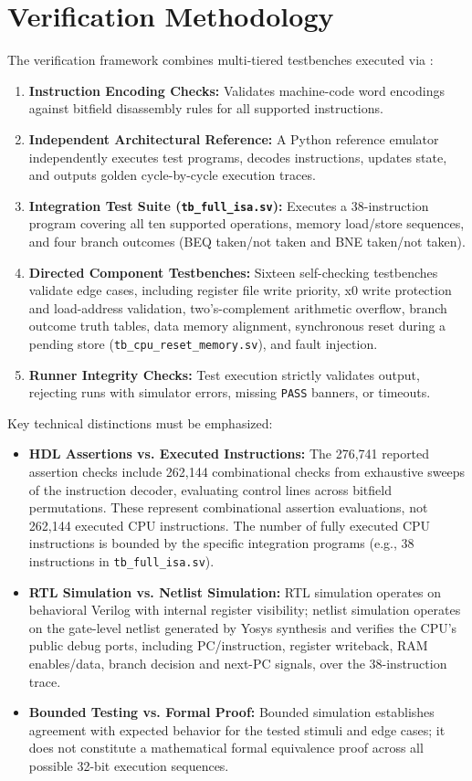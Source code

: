 \documentclass[conference,a4paper]{IEEEtran}
\begin{document}
\section{Verification Methodology}
The verification framework combines multi-tiered testbenches executed via :
\begin{enumerate}
\item \textbf{Instruction Encoding Checks:} Validates machine-code word encodings against bitfield disassembly rules for all supported instructions.
\item \textbf{Independent Architectural Reference:} A Python reference emulator independently executes test programs, decodes instructions, updates state, and outputs golden cycle-by-cycle execution traces.
\item \textbf{Integration Test Suite (\texttt{tb\_full\_isa.sv}):} Executes a 38-instruction program covering all ten supported operations, memory load/store sequences, and four branch outcomes (BEQ taken/not taken and BNE taken/not taken).
\item \textbf{Directed Component Testbenches:} Sixteen self-checking testbenches validate edge cases, including register file write priority, x0 write protection and load-address validation, two's-complement arithmetic overflow, branch outcome truth tables, data memory alignment, synchronous reset during a pending store (\texttt{tb\_cpu\_reset\_memory.sv}), and fault injection.
\item \textbf{Runner Integrity Checks:} Test execution strictly validates output, rejecting runs with simulator errors, missing \texttt{PASS} banners, or timeouts.
\end{enumerate}

Key technical distinctions must be emphasized:
\begin{itemize}
\item \textbf{HDL Assertions vs. Executed Instructions:} The 276,741 reported assertion checks include 262,144 combinational checks from exhaustive sweeps of the instruction decoder, evaluating control lines across bitfield permutations. These represent combinational assertion evaluations, not 262,144 executed CPU instructions. The number of fully executed CPU instructions is bounded by the specific integration programs (e.g., 38 instructions in \texttt{tb\_full\_isa.sv}).
\item \textbf{RTL Simulation vs. Netlist Simulation:} RTL simulation operates on behavioral Verilog with internal register visibility; netlist simulation operates on the gate-level netlist generated by Yosys synthesis and verifies the CPU's public debug ports, including PC/instruction, register writeback, RAM enables/data, branch decision and next-PC signals, over the 38-instruction trace.
\item \textbf{Bounded Testing vs. Formal Proof:} Bounded simulation establishes agreement with expected behavior for the tested stimuli and edge cases; it does not constitute a mathematical formal equivalence proof across all possible 32-bit execution sequences.
\end{itemize}
\end{document}
